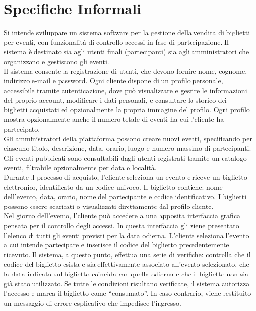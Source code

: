 \chapter{Specifiche Informali}

Si intende sviluppare un sistema software per la gestione della vendita di biglietti per eventi, con funzionalità di controllo accessi in fase di partecipazione. Il sistema è destinato sia agli utenti finali (partecipanti) sia agli amministratori che organizzano e gestiscono gli eventi.\\

\noindent Il sistema consente la registrazione di utenti, che devono fornire nome, cognome, indirizzo e-mail e password. Ogni cliente dispone di un profilo personale, accessibile tramite autenticazione, dove può visualizzare e gestire le informazioni del proprio account, modificare i dati personali, e consultare lo storico dei biglietti acquistati ed opzionalmente la propria immagine del profilo. Ogni profilo mostra opzionalmente anche il numero totale di eventi ha cui l’cliente ha partecipato.\\

\noindent Gli amministratori della piattaforma possono creare nuovi eventi, specificando per ciascuno titolo, descrizione, data, orario, luogo e numero massimo di partecipanti. Gli eventi pubblicati sono consultabili dagli utenti registrati tramite un catalogo eventi, filtrabile opzionalmente per data o località.\\

\noindent Durante il processo di acquisto, l’cliente seleziona un evento e riceve un biglietto elettronico, identificato da un codice univoco. Il biglietto contiene: nome dell’evento, data, orario, nome del partecipante e codice identificativo. I biglietti possono essere scaricati o visualizzati direttamente dal profilo cliente.\\

\noindent Nel giorno dell’evento, l’cliente può accedere a una apposita interfaccia grafica pensata per il controllo degli accessi. In questa interfaccia gli viene presentato l’elenco di tutti gli eventi previsti per la data odierna. L’cliente seleziona l’evento a cui intende partecipare e inserisce il codice del biglietto precedentemente ricevuto. Il sistema, a questo punto, effettua una serie di verifiche: controlla che il codice del biglietto esista e sia effettivamente associato all’evento selezionato, che la data indicata sul biglietto coincida con quella odierna e che il biglietto non sia già stato utilizzato. Se tutte le condizioni risultano verificate, il sistema autorizza l’accesso e marca il biglietto come “consumato”. In caso contrario, viene restituito un messaggio di errore esplicativo che impedisce l’ingresso.\\


